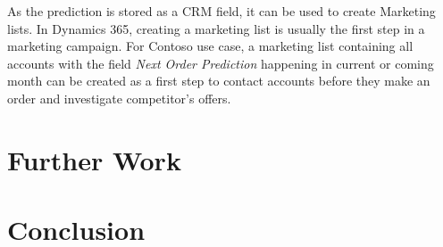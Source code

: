 As the prediction is stored as a CRM field, it can be used to create Marketing lists. In Dynamics 365, creating a marketing list is usually the first step in a marketing campaign. For Contoso use case, a marketing list containing all accounts with the field \textit{Next Order Prediction} happening in current or coming month can be created as a first step to contact accounts before they make an order and investigate competitor's offers.


\section{Further Work} \label{sec:use-case-further-work}



\section{Conclusion} \label{sec:use-case-conclusion}